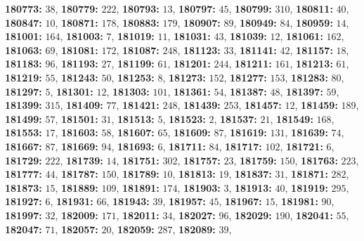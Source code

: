 \textsf{\bfseries 180773:} $38$, \textsf{\bfseries 180779:} $222$, \textsf{\bfseries 180793:} $13$, \textsf{\bfseries 180797:} $45$, \textsf{\bfseries 180799:} $310$, \textsf{\bfseries 180811:} $40$, \textsf{\bfseries 180847:} $10$, \textsf{\bfseries 180871:} $178$, \textsf{\bfseries 180883:} $179$, \textsf{\bfseries 180907:} $89$, \textsf{\bfseries 180949:} $84$, \textsf{\bfseries 180959:} $14$, \textsf{\bfseries 181001:} $164$, \textsf{\bfseries 181003:} $7$, \textsf{\bfseries 181019:} $11$, \textsf{\bfseries 181031:} $43$, \textsf{\bfseries 181039:} $12$, \textsf{\bfseries 181061:} $162$, \textsf{\bfseries 181063:} $69$, \textsf{\bfseries 181081:} $172$, \textsf{\bfseries 181087:} $248$, \textsf{\bfseries 181123:} $33$, \textsf{\bfseries 181141:} $42$, \textsf{\bfseries 181157:} $18$, \textsf{\bfseries 181183:} $96$, \textsf{\bfseries 181193:} $27$, \textsf{\bfseries 181199:} $61$, \textsf{\bfseries 181201:} $244$, \textsf{\bfseries 181211:} $161$, \textsf{\bfseries 181213:} $61$, \textsf{\bfseries 181219:} $55$, \textsf{\bfseries 181243:} $50$, \textsf{\bfseries 181253:} $8$, \textsf{\bfseries 181273:} $152$, \textsf{\bfseries 181277:} $153$, \textsf{\bfseries 181283:} $80$, \textsf{\bfseries 181297:} $5$, \textsf{\bfseries 181301:} $12$, \textsf{\bfseries 181303:} $101$, \textsf{\bfseries 181361:} $54$, \textsf{\bfseries 181387:} $48$, \textsf{\bfseries 181397:} $59$, \textsf{\bfseries 181399:} $315$, \textsf{\bfseries 181409:} $77$, \textsf{\bfseries 181421:} $248$, \textsf{\bfseries 181439:} $253$, \textsf{\bfseries 181457:} $12$, \textsf{\bfseries 181459:} $189$, \textsf{\bfseries 181499:} $57$, \textsf{\bfseries 181501:} $31$, \textsf{\bfseries 181513:} $5$, \textsf{\bfseries 181523:} $2$, \textsf{\bfseries 181537:} $21$, \textsf{\bfseries 181549:} $168$, \textsf{\bfseries 181553:} $17$, \textsf{\bfseries 181603:} $58$, \textsf{\bfseries 181607:} $65$, \textsf{\bfseries 181609:} $87$, \textsf{\bfseries 181619:} $131$, \textsf{\bfseries 181639:} $74$, \textsf{\bfseries 181667:} $87$, \textsf{\bfseries 181669:} $94$, \textsf{\bfseries 181693:} $6$, \textsf{\bfseries 181711:} $84$, \textsf{\bfseries 181717:} $102$, \textsf{\bfseries 181721:} $6$, \textsf{\bfseries 181729:} $222$, \textsf{\bfseries 181739:} $14$, \textsf{\bfseries 181751:} $302$, \textsf{\bfseries 181757:} $23$, \textsf{\bfseries 181759:} $150$, \textsf{\bfseries 181763:} $223$, \textsf{\bfseries 181777:} $44$, \textsf{\bfseries 181787:} $150$, \textsf{\bfseries 181789:} $10$, \textsf{\bfseries 181813:} $19$, \textsf{\bfseries 181837:} $31$, \textsf{\bfseries 181871:} $282$, \textsf{\bfseries 181873:} $15$, \textsf{\bfseries 181889:} $109$, \textsf{\bfseries 181891:} $174$, \textsf{\bfseries 181903:} $3$, \textsf{\bfseries 181913:} $40$, \textsf{\bfseries 181919:} $295$, \textsf{\bfseries 181927:} $6$, \textsf{\bfseries 181931:} $66$, \textsf{\bfseries 181943:} $39$, \textsf{\bfseries 181957:} $45$, \textsf{\bfseries 181967:} $15$, \textsf{\bfseries 181981:} $90$, \textsf{\bfseries 181997:} $32$, \textsf{\bfseries 182009:} $171$, \textsf{\bfseries 182011:} $34$, \textsf{\bfseries 182027:} $96$, \textsf{\bfseries 182029:} $190$, \textsf{\bfseries 182041:} $55$, \textsf{\bfseries 182047:} $71$, \textsf{\bfseries 182057:} $20$, \textsf{\bfseries 182059:} $287$, \textsf{\bfseries 182089:} $39$, 
